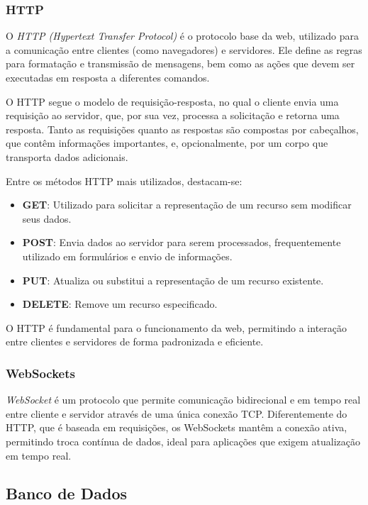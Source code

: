 \subsubsection{HTTP}

O \emph{HTTP (Hypertext Transfer Protocol)} é o protocolo base da web, utilizado para a comunicação entre clientes (como navegadores) e servidores. Ele define as regras para formatação e transmissão de mensagens, bem como as ações que devem ser executadas em resposta a diferentes comandos.

O HTTP segue o modelo de requisição-resposta, no qual o cliente envia uma requisição ao servidor, que, por sua vez, processa a solicitação e retorna uma resposta. Tanto as requisições quanto as respostas são compostas por cabeçalhos, que contêm informações importantes, e, opcionalmente, por um corpo que transporta dados adicionais.

Entre os métodos HTTP mais utilizados, destacam-se:

\begin{itemize}
    \item \textbf{GET}: Utilizado para solicitar a representação de um recurso sem modificar seus dados.
    \item \textbf{POST}: Envia dados ao servidor para serem processados, frequentemente utilizado em formulários e envio de informações.
    \item \textbf{PUT}: Atualiza ou substitui a representação de um recurso existente.
    \item \textbf{DELETE}: Remove um recurso especificado.
\end{itemize}

O HTTP é fundamental para o funcionamento da web, permitindo a interação entre clientes e servidores de forma padronizada e eficiente.

\subsubsection{WebSockets}

\emph{WebSocket} é um protocolo que permite comunicação bidirecional e em tempo real entre cliente e servidor através de uma única conexão TCP. Diferentemente do HTTP, que é baseada em requisições, os WebSockets mantêm a conexão ativa, permitindo troca contínua de dados, ideal para aplicações que exigem atualização em tempo real.


\subsection{Banco de Dados}

